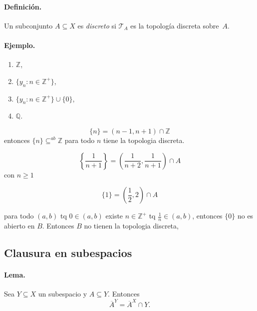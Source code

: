\paragraph{\textbf{Definición.}}
Un subconjunto $A\subseteq X$ es \emph{discreto} si $\mathcal T_{A}$ es la topología discreta sobre $A$.

\paragraph{\textbf{Ejemplo.}}
\begin{enumerate}[label=(\alph*)]
  \item $\mathbb{Z}$,
  \item $\{y_{n}:n\in\mathbb{Z}^{+}\}$,
  \item $\{y_{n}:n\in\mathbb{Z}^{+}\}\cup\{0\}$,
  \item $\mathbb{Q}$.
\end{enumerate}

$$
\{n\} = \left(n-1,n+1\right) \cap \mathbb Z
$$
 entonces $\{n\} \subseteq^{ab} \mathbb Z$ para todo $n$ tiene la topologia discreta.


$$
\left\{\frac 1{n+1}\right\} = \left(\frac 1{n+2},\frac 1{n+1}\right) \cap A
$$
con $n\geq 1$ 


$$
\{
    1
\} =  \left(\frac 12,2\right) \cap A$$


para todo $(a,b)$ tq $0 \in (a,b)$ existe $n \in \mathbb Z^+$ tq $\frac 1n \in (a,b)$, entonces $\{0\}$ no es abierto en $B$. Entonces $B$ no tienen la topologia discreta,



\subsection{Clausura en subespacios}

\paragraph{\textbf{Lema.}}
Sea $Y\subseteq X$ un subespacio y $A\subseteq Y$. Entonces
\[
  \overline{A}^{Y} = \overline{A}^{X}\cap Y.
\]

